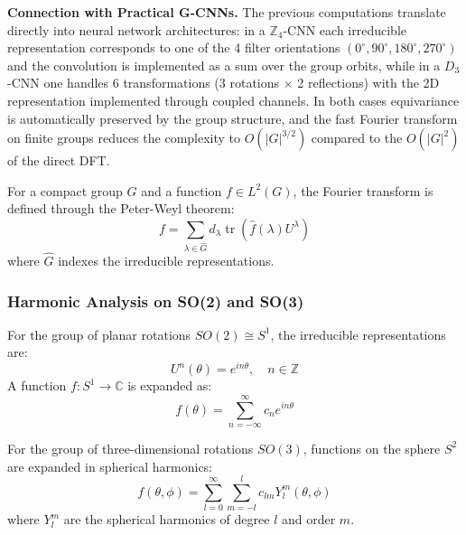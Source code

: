 \textbf{Connection with Practical G-CNNs.} The previous computations translate directly into neural network architectures: in a $\mathbb{Z}_4$-CNN each irreducible representation corresponds to one of the 4 filter orientations $(0^\circ, 90^\circ, 180^\circ, 270^\circ)$ and the convolution is implemented as a sum over the group orbits, while in a $D_3$-CNN one handles 6 transformations (3 rotations $\times$ 2 reflections) with the 2D representation implemented through coupled channels. In both cases equivariance is automatically preserved by the group structure, and the fast Fourier transform on finite groups reduces the complexity to $O(|G|^{3/2})$ compared to the $O(|G|^2)$ of the direct DFT.

\begin{definition}\label{def:fourier_grupos_compactos}
For a compact group $G$ and a function $f \in L^2(G)$, the Fourier transform is defined through the Peter-Weyl theorem:
\begin{equation}
f = \sum_{\lambda \in \widehat{G}} d_\lambda \operatorname{tr}(\hat{f}(\lambda) U^\lambda)
\end{equation}
where $\widehat{G}$ indexes the irreducible representations.
\end{definition}

\subsubsection{Harmonic Analysis on SO(2) and SO(3)}

\begin{definition}\label{def:armonicos_circulares}
For the group of planar rotations $SO(2) \cong S^1$, the irreducible representations are:
\begin{equation}
U^n(\theta) = e^{in\theta}, \quad n \in \mathbb{Z}
\end{equation}
A function $f: S^1 \to \mathbb{C}$ is expanded as:
\begin{equation}
f(\theta) = \sum_{n=-\infty}^{\infty} c_n e^{in\theta}
\end{equation}
\end{definition}

\begin{definition}\label{def:armonicos_esfericos}
For the group of three-dimensional rotations $SO(3)$, functions on the sphere $S^2$ are expanded in spherical harmonics:
\begin{equation}
f(\theta, \phi) = \sum_{l=0}^{\infty} \sum_{m=-l}^{l} c_{lm} Y_l^m(\theta, \phi)
\end{equation}
where $Y_l^m$ are the spherical harmonics of degree $l$ and order $m$.
\end{definition}

